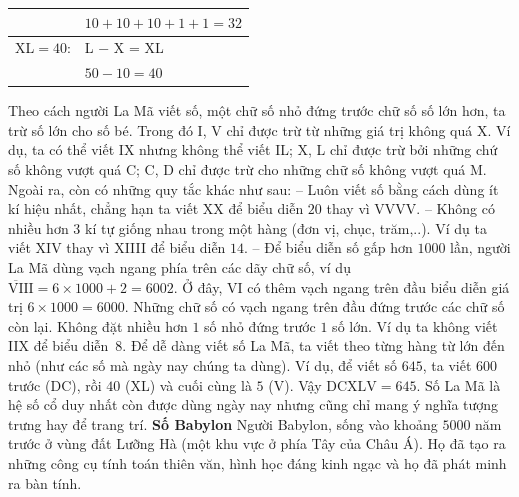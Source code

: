 \begin{multicols}{2}
\begin{table}[H]
\begin{tabular}{|l l|}
				&$10 +10 +10+1+1=32$\\
				\hline
				XL$= 40$:&     L $-$ X = XL\\
				&$50 - 10 = 40$\\
				\hline
		\end{tabular}
		\vspace*{-10pt}
	\end{table}
	Theo cách người La Mã viết số, một chữ số nhỏ đứng trước chữ số số lớn hơn, ta trừ số lớn cho số bé. Trong đó I, V chỉ được trừ từ những giá trị không quá X. Ví dụ, ta có thể viết IX nhưng không thể viết IL; X, L chỉ được trừ bởi những chứ số không vượt quá C; C, D chỉ được trừ cho những chữ số không vượt quá M. Ngoài ra, còn có những quy tắc khác như sau:
	\vskip 0.1cm
	-- Luôn viết số bằng cách dùng ít kí hiệu nhất, chẳng hạn ta viết XX để biểu diễn $20$ thay vì VVVV.
	\vskip 0.1cm
	-- Không có nhiều hơn $3$ kí tự giống nhau trong một hàng (đơn vị, chục, trăm,..). Ví dụ ta viết XIV thay vì XIIII để biểu diễn $14$.
	\vskip 0.1cm
	-- Để biểu diễn số gấp hơn $1000$ lần, người La Mã dùng vạch ngang phía trên các dãy chữ số, ví dụ $\overline{\text{VI}}\text{II}=6\times 1000+2=6002$. Ở đây, VI có thêm vạch ngang trên đầu biểu diễn giá trị $6\times 1000 = 6000$. Những chữ số có vạch ngang trên đầu đứng trước các chữ số còn lại.
	\vskip 0.1cm
	Không đặt nhiều hơn $1$ số nhỏ đứng trước $1$ số lớn. Ví dụ ta không viết IIX để biểu diễn~$8$.
	\vskip 0.1cm
	Để dễ dàng viết số La Mã, ta viết theo từng hàng từ  lớn đến nhỏ (như các số mà ngày nay chúng ta dùng). Ví dụ, để viết số $645$, ta viết $600$ trước (DC), rồi $40$ (XL) và cuối cùng là $5$ (V). Vậy $\text{DCXLV}=645$.
	Số La Mã là hệ số cổ duy nhất còn được dùng ngày nay nhưng cũng chỉ mang ý nghĩa tượng trưng hay để trang trí.
	\vskip 0.1cm
	\columnbreak
	\textbf{Số Babylon}
	Người Babylon, sống vào khoảng $5000$ năm trước ở vùng đất Lưỡng Hà (một khu vực ở phía Tây của  Châu Á). Họ đã tạo ra những công cụ tính toán thiên văn, hình học đáng kinh ngạc và họ đã phát minh ra bàn tính.
		\begin{figure}[H]
		\centering
		\vspace*{-5pt}
		\captionsetup{labelformat= empty, justification=centering}

\end{figure}
\end{multicols}
